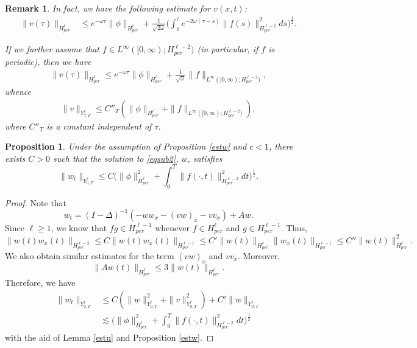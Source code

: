 \documentclass[10pt,a4paper,final]{article}
\numberwithin{equation}{section}
\newtheorem{prop}[theorem]{Proposition}
\newtheorem{remark}[theorem]{Remark}
\newcommand{\cH}{\mathcal{H}}
\newcommand{\Go}{\omega}
\begin{document}
\begin{remark} \label{rmkforfinLinfty}
In fact, we have the following estimate for $v(x,t)$:
\begin{align*}
    \|v(\tau)\|_{H^{\ell}_{per}}%
    &\leq e^{-\omega\tau}\|\phi\|_{H^{\ell}_{per}}+\frac{1}{\sqrt{2\Go}} \bigg(\int_0^{\tau}e^{-2\Go(\tau-s)}\|f(s)\|^2_{H^{\ell-2}_{per}}ds\bigg)^{\frac12}.
\end{align*}

If we further assume that $f\in L^{\infty}([0,\infty); H^{\ell-2}_{per})$ (in particular, if $f$ is periodic), then we have
    \begin{align*}
        \|v(\tau)\|_{H^{\ell}_{per}}\leq e^{-\omega\tau}\|\phi\|_{H^{\ell}_{per}}+\frac{1}{\sqrt{\Go}}\|f\|_{L^{\infty}([0,\infty);H^{\ell-2}_{per})},
    \end{align*}
    whence
    \begin{align}\label{estimateA}
        \|v\|_{Y^{\ell}_{\tau,T}}\leq C''_T (\|\phi\|_{H^{\ell}_{per}}+\|f\|_{L^{\infty}([0,\infty);H^{\ell-2}_{per})}),
    \end{align}
    where $C''_T$ is a constant independent of $\tau$.
\end{remark}

\begin{prop}
    Under the assumption of Proposition \ref{estw} and $c<1$, there exists $C>0$ such that the solution to \eqref{eqsub2}, $w$, satisfies
    $$\|w_t\|_{Y^{\ell}_{0,T}}\leq C  \bigg(\|\phi\|_{H^{\ell}_{per}}^2+\int_0^T\|f(\cdot,t)\|_{H^{\ell-2}_{per}}^2dt\bigg)^{\frac12}. $$
\end{prop}
\begin{proof}
    Note that 
    $$w_t=(I-\Delta)^{-1}(-ww_x-(vw)_x-vv_x)+Aw.$$
    Since $\ell\geq 1$, we know that $fg\in H^{\ell-1}_{per}$ whenever $f\in H^{\ell}_{per}$ and $g\in H^{\ell-1}_{per}$.
    Thus, 
    $$\|w(t)w_x(t)\|_{H^{\ell-2}_{per}}\leq C\|w(t)w_x(t)\|_{H^{\ell-1}_{per}}\leq C'\|w(t)\|_{H^{\ell}_{per}}\|w_x(t)\|_{H^{\ell-1}_{per}}\leq C''\|w(t)\|_{H^{\ell}_{per}}^2.$$
    We also obtain similar estimates for the term $(vw)_x$ and $vv_x$. Moreover, 
    $$\|Aw(t)\|_{H^{\ell}_{per}}\leq 3\|w(t)\|_{H^{\ell}_{per}}.$$
    Therefore, we have 
    \begin{align*}
        \|w_t\|_{Y^{\ell}_{0,T}}&\leq C (\|w\|^2_{Y^{\ell}_{0,T}}+\|v\|_{Y^{\ell}_{0,T}}^2)+C'\|w\|_{Y^{\ell}_{0,T}}\\
        &\lesssim  \bigg(\|\phi\|_{H^{\ell}_{per}}^2+\int_0^T\|f(\cdot,t)\|_{H^{\ell-2}_{per}}^2dt\bigg)^{\frac12}
    \end{align*}
    with the aid of Lemma \ref{estu} and Proposition \ref{estw}.
\end{proof}
\end{document}
